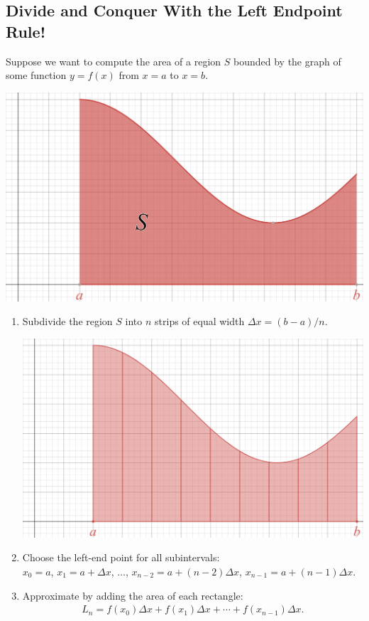 \documentclass[12pt,a4paper]{article}
\begin{document}
	\newpage
	
	\subsection{Divide and Conquer With the Left Endpoint Rule!}
	
	Suppose we want to compute the area of a region $S$ bounded by the graph of some function $y = f(x)$ from $x = a$ to $x = b$.
	
	\begin{center}
	\includegraphics[scale=0.39]{regionS.png}
	\end{center}
	
	\begin{enumerate}[label=\underline{\textsc{Step} \Roman*}]
	\item Subdivide the region $S$ into $n$ strips of equal width $\Delta x = (b - a)/n$.
		\begin{center}
		\includegraphics[scale=0.365]{regionSDivided}
		\end{center}
		\vspace*{10pt}
	\item Choose the left-end point for all subintervals: \\
	$x_0 = a$, $x_1 = a + \Delta x$, $\ldots$, $x_{n-2} = a + (n - 2) \Delta x$, $x_{n-1} = a + (n - 1) \Delta x$.
	\item Approximate by adding the area of each rectangle:
		\begin{align*}
		L_n = f(x_0) \Delta x + f(x_1) \Delta x + \cdots + f(x_{n-1}) \Delta x .
		\end{align*}
	\end{enumerate}
	
\end{document}
